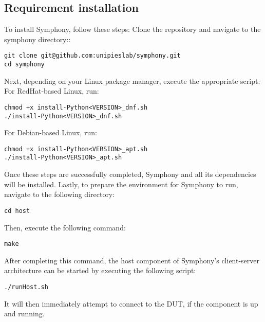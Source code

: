 \subsection{Requirement installation}
To install Symphony, follow these steps:
Clone the repository and navigate to the symphony directory::

\begin{lstlisting}
git clone git@github.com:unipieslab/symphony.git
cd symphony
\end{lstlisting}
Next, depending on your Linux package manager, execute the appropriate script: \\
For RedHat-based Linux, run:
\begin{lstlisting}
chmod +x install-Python<VERSION>_dnf.sh
./install-Python<VERSION>_dnf.sh
\end{lstlisting}
For Debian-based Linux, run:
\begin{lstlisting}
chmod +x install-Python<VERSION>_apt.sh
./install-Python<VERSION>_apt.sh
\end{lstlisting}
Once these steps are successfully completed, Symphony and all its dependencies will be installed. Lastly, to prepare the environment for Symphony to run, navigate to the following directory:
\begin{lstlisting}
cd host
\end{lstlisting}
Then, execute the following command:
\begin{lstlisting}
make
\end{lstlisting}
After completing this command, the host component of Symphony's client-server architecture can be started by executing the following script:
\begin{lstlisting}
./runHost.sh
\end{lstlisting}
It will then immediately attempt to connect to the DUT, if the component is up and running.